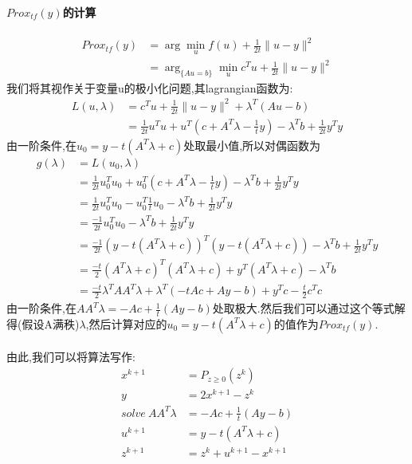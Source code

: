 \documentclass[UTF8]{ctexart}
\begin{document}
\paragraph{$Prox_{tf}(y)$的计算}
\begin{align*}
  Prox_{tf}(y) & =\arg\min_u f(u)+\frac{1}{2t}\|u-y\|^2\\
   &             =\arg_{\{Au=b\}}\min_u c^Tu+ \frac{1}{2t}\|u-y\|^2
\end{align*}
我们将其视作关于变量u的极小化问题,其lagrangian函数为:
\begin{align*}
  L(u,\lambda) & =c^Tu + \frac{1}{2t}\|u-y\|^2 + \lambda^T(Au-b)\\
   &             =\frac{1}{2t}u^Tu + u^T(c+A^T\lambda-\frac{1}{t}y) -\lambda^Tb+\frac{1}{2t}y^Ty
\end{align*}
由一阶条件,在$u_0=y-t(A^T\lambda+c)$处取最小值,所以对偶函数为
\begin{align*}
  g(\lambda) & =L(u_0,\lambda)\\
   &           =\frac{1}{2t}u_0^Tu_0 + u_0^T(c+A^T\lambda-\frac{1}{t}y) -\lambda^Tb+\frac{1}{2t}y^Ty \\
   &           =\frac{1}{2t}u_0^Tu_0 - u_0^T\frac{1}{t}u_0 -\lambda^Tb+\frac{1}{2t}y^Ty \\
   &           =\frac{-1}{2t}u_0^Tu_0 -\lambda^Tb+\frac{1}{2t}y^Ty \\
   &           =\frac{-1}{2t}(y-t(A^T\lambda+c))^T(y-t(A^T\lambda+c)) - \lambda^Tb+\frac{1}{2t}y^Ty\\
   &           =\frac{-t}{2}(A^T\lambda+c)^T(A^T\lambda+c) + y^T(A^T\lambda+c)-\lambda^Tb\\
   &           =\frac{-t}{2}\lambda^TAA^T\lambda +\lambda^T(-tAc+Ay-b) +y^Tc -\frac{t}{2}c^Tc
\end{align*}
由一阶条件,在$AA^T\lambda=-Ac+\frac{1}{t}(Ay-b)$处取极大.然后我们可以通过这个等式解得(假设A满秩)$\lambda$,然后计算对应的$u_0=y-t(A^T\lambda+c)$的值作为$Prox_{tf}(y)$.
\paragraph{}
由此,我们可以将算法写作:
\begin{equation}
  \begin{split}
     x^{k+1} &=  P_{z\geq 0}(z^k)\\
     y      &= 2x^{k+1}-z^k\\
      solve\ AA^T\lambda&=-Ac+\frac{1}{t}(Ay-b) \\
      u^{k+1} &= y-t(A^T\lambda+c)\\
       z^{k+1}&= z^k+u^{k+1}-x^{k+1}
  \end{split}
\end{equation}
\end{document}

